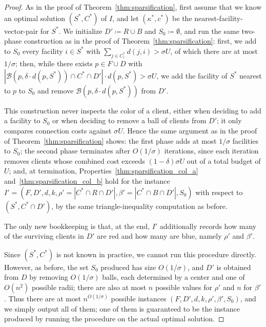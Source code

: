 \begin{proof}
As in the proof of Theorem~\ref{thm:sparsification}, first assume that we know an optimal solution $(S^*,C^*)$ of $I$, and let $(\kappa^*,c^*)$ be the nearest-facility-vector-pair for $S^*$. We initialize $D' \coloneqq R \cup B$ and $S_0 \coloneqq \emptyset$, and run the same two-phase construction as in the proof of Theorem~\ref{thm:sparsification}: first, we add to $S_0$ every facility $i \in S^*$ with $\sum_{j \in C_i^*} d(j,i) > \sigma U$, of which there are at most $1/\sigma$; then, while there exists $p \in F \cup D$ with $|\mathcal{B}(p, \delta \cdot d(p, S^*)) \cap C^* \cap D'| \cdot d(p, S^*) > \sigma U$, we add the facility of $S^*$ nearest to $p$ to $S_0$ and remove $\mathcal{B}(p, \delta \cdot d(p, S^*))$ from $D'$.

This construction never inspects the color of a client, either when deciding to add a facility to $S_0$ or when deciding to remove a ball of clients from $D'$; it only compares connection costs against $\sigma U$. Hence the same argument as in the proof of Theorem~\ref{thm:sparsification} shows: the first phase adds at most $1/\sigma$ facilities to $S_0$; the second phase terminates after $O(1/\sigma)$ iterations, since each iteration removes clients whose combined cost exceeds $(1-\delta)\sigma U$ out of a total budget of $U$; and, at termination, Properties~\ref{thm:sparsification_col_a} and~\ref{thm:sparsification_col_b} hold for the instance $I' = (F, D', d, k, \rho' = |C^* \cap R \cap D'|, \beta' = |C^* \cap B \cap D'|, S_0)$ with respect to $(S^*, C^* \cap D')$, by the same triangle-inequality computation as before.

The only new bookkeeping is that, at the end, $I'$ additionally records how many of the surviving clients in $D'$ are red and how many are blue, namely $\rho'$ and $\beta'$.

Since $(S^*,C^*)$ is not known in practice, we cannot run this procedure directly. However, as before, the set $S_0$ produced has size $O(1/\sigma)$, and $D'$ is obtained from $D$ by removing $O(1/\sigma)$ balls, each determined by a center and one of $O(n^2)$ possible radii; there are also at most $n$ possible values for $\rho'$ and $n$ for $\beta'$. Thus there are at most $n^{O(1/\sigma)}$ possible instances $(F,D',d,k,\rho',\beta',S_0)$, and we simply output all of them; one of them is guaranteed to be the instance produced by running the procedure on the actual optimal solution.
\end{proof}

